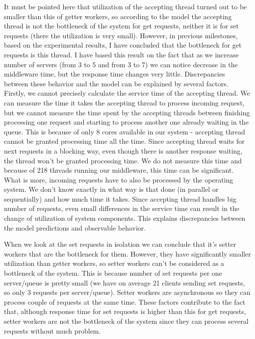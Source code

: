 \documentclass[11pt]{article}
\begin{document}
It must be pointed here that utilization of the accepting thread turned out to be smaller than this of getter workers, so according to the model the accepting thread is not the bottleneck of the system for get requests, neither it is for set requests (there the utilization is very small). However, in previous milestones, based on the experimental results, I have concluded that the bottleneck for get requests is this thread. I have based this result on the fact that as we increase number of servers (from 3 to 5 and from 3 to 7) we can notice decrease in the middleware time, but the response time changes very little. Discrepancies between these behavior and the model can be explained by several factors. Firstly, we cannot precisely calculate the service time of the accepting thread. We can measure the time it takes the accepting thread to process incoming request, but we cannot measure the time spent by the accepting threads between finishing processing one request and starting to process another one already waiting in the queue. This is because of only 8 cores available in our system - accepting thread cannot be granted processing time all the time. Since accepting thread waits for next requests in a blocking way, even though there is another response waiting, the thread won't be granted processing time. We do not measure this time and because of 218 threads running our middleware, this time can be significant. What is more, incoming requests have to also be processed by the operating system. We don't know exactly in what way is that done (in parallel or sequentially) and how much time it takes. Since accepting thread handles big number of requests, even small differences in the service time can result in the change of utilization of system components. This explains discrepancies between the model predictions and observable behavior.

When we look at the set requests in isolation we can conclude that it's setter workers that are the bottleneck for them. However, they have significantly smaller utilization than getter workers, so setter workers can't be considered as a bottleneck of the system. This is because number of set requests per one server/queue is pretty small (we have on average 21 clients sending set requests, so only 3 requests per server/queue). Setter workers are asynchronous so they can process couple of requests at the same time. These factors contribute to the fact that, although response time for set requests is higher than this for get requests, setter workers are not the bottleneck of the system since they can process several requests without much problem.
\end{document}
